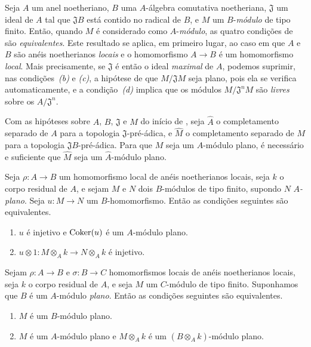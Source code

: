 \begin{env}[10.2.2]
\label{0.10.2.2}
Seja $A$ um anel noetheriano, $B$ uma $A$-álgebra comutativa noetheriana, $\mathfrak{J}$ um ideal de $A$ tal que $\mathfrak{J}B$ está contido no radical de $B$, e $M$ um $B$-\emph{módulo} de tipo finito.
Então, quando $M$ é considerado como $A$-\emph{módulo}, as quatro condições de  são \emph{equivalentes}.
Este resultado se aplica, em primeiro lugar, ao caso em que $A$ e $B$ são anéis noetherianos \emph{locais} e o homomorfismo $A\to B$ é um homomorfismo \emph{local}.
Mais precisamente, se $\mathfrak{J}$ é então o ideal \emph{maximal} de $A$, podemos suprimir, nas condições~\emph{(b)} e \emph{(c)}, a hipótese de que $M/\mathfrak{J}M$ seja plano, pois ela se verifica automaticamente, e a condição~\emph{(d)} implica que os módulos $M/\mathfrak{J}^nM$ são \emph{livres} sobre os $A/\mathfrak{J}^n$.
\end{env}

\begin{env}[10.2.3]
\label{0.10.2.3}
Com as hipóteses sobre $A$, $B$, $\mathfrak{J}$ e $M$ do início de , seja $\widehat{A}$ o completamento separado de $A$ para a topologia $\mathfrak{J}$-pré-ádica, e $\widehat{M}$ o completamento separado de $M$ para a topologia $\mathfrak{J}B$-pré-ádica.
Para que $M$ seja um $A$-módulo plano, é necessário e suficiente que $\widehat{M}$ seja um $\widehat{A}$-módulo plano.
\end{env}

\begin{env}[10.2.4]
\label{0.10.2.4}
Seja $\rho:A\to B$ um homomorfismo local de anéis noetherianos locais, seja $k$ o corpo residual de $A$, e sejam $M$ e $N$ dois $B$-módulos de tipo finito, supondo $N$ \emph{$A$-plano}.
Seja $u:M\to N$ um $B$-homomorfismo.
Então as condições seguintes são equivalentes.
\begin{enumerate}
  \item[(a)] $u$ é injetivo e $\operatorname{Coker}(u)$ é um $A$-módulo plano.
  \item[(b)] $u\otimes1:M\otimes_A k\to N\otimes_A k$ é injetivo.
\end{enumerate}
\end{env}

\begin{env}[10.2.5]
\label{0.10.2.5}
Sejam $\rho:A\to B$ e $\sigma:B\to C$ homomorfismos locais de anéis noetherianos locais, seja $k$ o corpo residual de $A$, e seja $M$ um $C$-módulo de tipo finito.
Suponhamos que $B$ é um $A$-módulo \emph{plano}.
Então as condições seguintes são equivalentes.
\begin{enumerate}
  \item[(a)] $M$ é um $B$-módulo plano.
  \item[(b)] $M$ é um $A$-módulo plano e $M\otimes_A k$ é um $(B\otimes_A k)$-módulo plano.
\end{enumerate}
\end{env}

